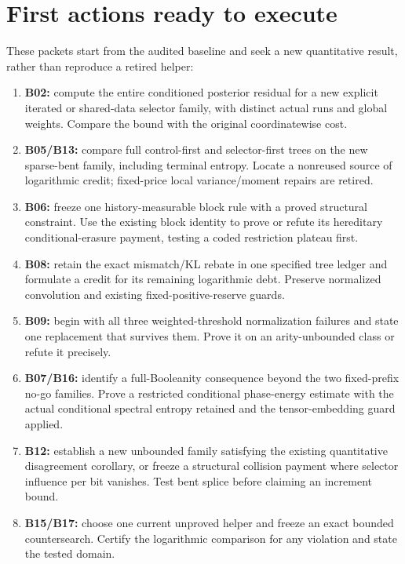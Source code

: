 \documentclass[11pt]{article}
\begin{document}
\section{First actions ready to execute}

These packets start from the audited baseline and seek a new
quantitative result, rather than reproduce a retired helper:
\begin{enumerate}
\item \textbf{B02:} compute the entire conditioned posterior
residual for a new explicit iterated or shared-data selector
family, with distinct actual runs and global weights. Compare
the bound with the original coordinatewise cost.
\item \textbf{B05/B13:} compare full control-first and selector-first
trees on the new sparse-bent family, including terminal entropy.
Locate a nonreused source of logarithmic credit; fixed-price
local variance/moment repairs are retired.
\item \textbf{B06:} freeze one history-measurable block rule with
a proved structural constraint. Use the existing block identity
to prove or refute its hereditary conditional-erasure payment,
testing a coded restriction plateau first.
\item \textbf{B08:} retain the exact mismatch/KL rebate in one
specified tree ledger and formulate a credit for its remaining
logarithmic debt. Preserve normalized convolution and existing
fixed-positive-reserve guards.
\item \textbf{B09:} begin with all three weighted-threshold
normalization failures and state one replacement that survives
them. Prove it on an arity-unbounded class or refute it precisely.
\item \textbf{B07/B16:} identify a full-Booleanity consequence
beyond the two fixed-prefix no-go families. Prove a restricted
conditional phase-energy estimate with the actual conditional
spectral entropy retained and the tensor-embedding guard applied.
\item \textbf{B12:} establish a new unbounded family satisfying
the existing quantitative disagreement corollary, or freeze a
structural collision payment where selector influence per bit
vanishes. Test bent splice before claiming an increment bound.
\item \textbf{B15/B17:} choose one current unproved helper and
freeze an exact bounded countersearch. Certify the logarithmic
comparison for any violation and state the tested domain.
\end{enumerate}
\end{document}
